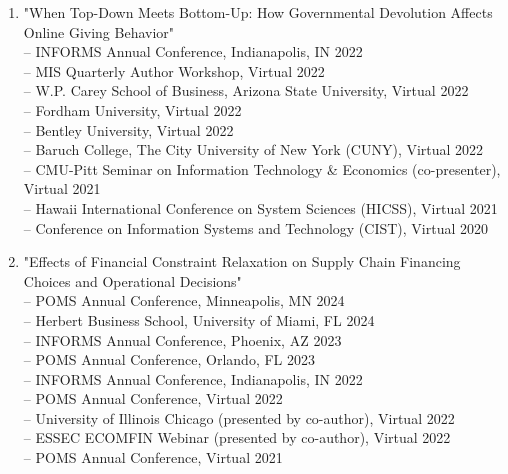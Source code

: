 \documentclass[margin,line]{resume}
\begin{document}
\begin{resume}
\begin{enumerate}[topsep=0pt, leftmargin=*]
 	     \item "When Top-Down Meets Bottom-Up: How Governmental Devolution Affects Online Giving Behavior"\\[0.3em]
 	          -- INFORMS Annual Conference, Indianapolis, IN \hfill  2022\\
 	          -- MIS Quarterly Author Workshop, Virtual \hfill 2022\\
 	           -- W.P. Carey School of Business, Arizona State University, Virtual \hfill2022\\
 	           -- Fordham University, Virtual  \hfill2022\\
 	           -- Bentley University, Virtual  \hfill2022\\
 	           -- Baruch College, The City University of New York (CUNY), Virtual \hfill2022\\
 	           -- CMU-Pitt Seminar on Information Technology \& Economics (co-presenter), Virtual \hfill2021\\
 	           -- Hawaii International Conference on System Sciences (HICSS), Virtual \hfill2021\\
 	           -- Conference on Information Systems and Technology (CIST), Virtual \hfill2020\\ 	      
\newpage

  	     \item "Effects of Financial Constraint Relaxation on Supply Chain Financing Choices and Operational Decisions"\\[0.3em]
        -- POMS Annual Conference, Minneapolis, MN \hfill   2024\\
        -- Herbert Business School, University of Miami, FL \hfill 2024\\ 
  	    -- INFORMS Annual Conference, Phoenix, AZ \hfill 2023\\ 
        -- POMS Annual Conference, Orlando, FL \hfill   2023\\
  	     -- INFORMS Annual Conference, Indianapolis, IN \hfill  2022\\
  	     -- POMS Annual Conference, Virtual \hfill2022\\
  	     -- University of Illinois Chicago (presented by co-author), Virtual \hfill 2022\\
 	           -- ESSEC ECOMFIN Webinar (presented by co-author), Virtual \hfill 2022\\
 	           -- POMS Annual Conference, Virtual \hfill2021\\


\end{enumerate}
\end{resume}
\end{document}
